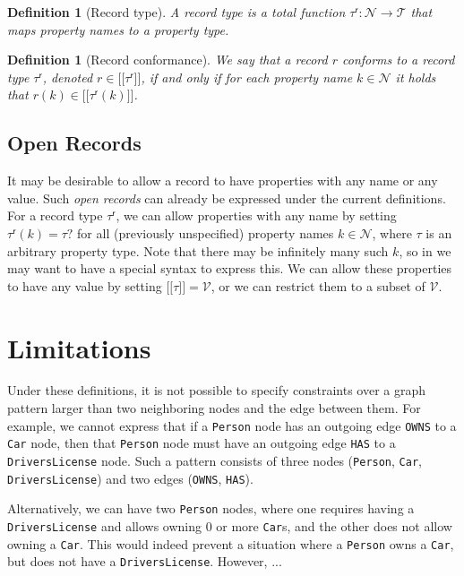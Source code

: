 \documentclass[a4paper]{article}
\newtheorem{definition}[theorem]{Definition}
\newcommand{\ptype}{\tau}
\newcommand{\ptypes}{\mathcal{T}}
\newcommand{\rtype}{\tau^\mathsf{r}}
\newcommand{\lsem}{\ensuremath{[\![}}
\newcommand{\rsem}{\ensuremath{]\!]}}
\newcommand{\sem}[1]{\ensuremath{\lsem #1 \rsem}}
\begin{document}
\begin{definition}[Record type]
  A \emph{record type} is a total function $\rtype : \mathcal{N} \to \ptypes$ that maps property names to a property type.
\end{definition}

\begin{definition}[Record conformance]
  We say that a record $r$ \emph{conforms} to a record type $\rtype$, denoted $r \in \sem{\rtype}$, if and only if for each property name $k \in \mathcal{N}$ it holds that $r(k) \in \sem{\rtype(k)}$.
\end{definition}

\subsection{Open Records}

It may be desirable to allow a record to have properties with any name or any value. Such \emph{open records} can already be expressed under the current definitions. For a record type $\rtype$, we can allow properties with any name by setting $\rtype(k) = \ptype?$ for all (previously unspecified) property names $k \in \mathcal{N}$, where $\ptype$ is an arbitrary property type. Note that there may be infinitely many such $k$, so in we may want to have a special syntax to express this. We can allow these properties to have any value by setting $\sem{\ptype} = \mathcal{V}$, or we can restrict them to a subset of $\mathcal{V}$.

\section{Limitations}

Under these definitions, it is not possible to specify constraints over a graph pattern larger than two neighboring nodes and the edge between them. For example, we cannot express that if a \texttt{Person} node has an outgoing edge \texttt{OWNS} to a \texttt{Car} node, then that \texttt{Person} node must have an outgoing edge \texttt{HAS} to a \texttt{DriversLicense} node. Such a pattern consists of three nodes (\texttt{Person}, \texttt{Car}, \texttt{DriversLicense}) and two edges (\texttt{OWNS}, \texttt{HAS}).

Alternatively, we can have two \texttt{Person} nodes, where one requires having a \texttt{DriversLicense} and allows owning 0 or more \texttt{Car}s, and the other does not allow owning a \texttt{Car}. This would indeed prevent a situation where a \texttt{Person} owns a \texttt{Car}, but does not have a \texttt{DriversLicense}. However, ...
\end{document}
